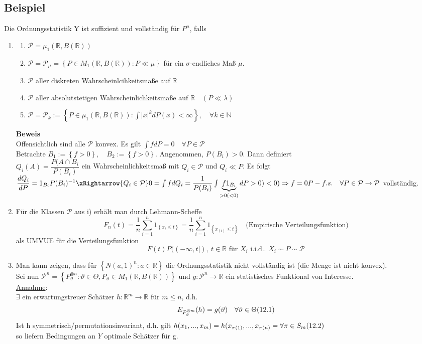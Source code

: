 \documentclass[german,10pt,oneside, fleqn, a4paper]{article}
\let\marvosymLightning\Lightning
\newcommand {\R}	{\mathbb{R}}
\newcommand {\N}	{\mathbb{N}}
\newcommand{\Ra}	{\Rightarrow}
\newcommand{\ra}{\rightarrow}
\newcommand{\sm}[2][\infty]{\sum\limits_{#2}^{#1}}
\newcommand{\brac}[1]{\left\lbrace #1\right\rbrace}
\newcommand{\mc}[1]{\mathcal{#1}}
\newcommand{\beweis}{\textbf{Beweis}\\}
\newcommand{\1}[1]{1_{#1}}
\newcommand{\2}[1]{\1{\brac{#1}}}
\newcommand{\wid}{\text{\marvosymLightning}}
\newcommand{\p}{\mc{P}}
\newcommand{\sumi}{\sm[n]{i=1}}
\newcommand{\qf}{\quad\forall}
\newcommand{\stuff}{{\otimes n}}
\begin{document}
\subsection{Beispiel}
\label{12.3}
Die Ordnungsstatistik Y ist suffizient und vollständig für $P^n$, falls
\begin{enumerate}[label=(\roman*)]
\item\begin{enumerate}[label=(\alph*)]
	\item $\p=\mu_1(\R,B(\R))$
	\item $\p=\p_\mu=\brac{P\in M_1(\R,B(\R)):P\ll\mu}$ für ein $\sigma$-endliches Maß $\mu$.
	\item $\p$ aller diskreten Wahrscheinlcihkeitsmaße auf $\R$
	\item $\p$ aller absolutstetigen Wahrscheinlichkeitsmaße auf $\R\quad (P\ll\lambda)$
	\item $\p=\p_k:=\brac{P\in\mu_1(\R,B(\R)):\int|x|^kdP(x)<\infty},\qf k\in\N$
\end{enumerate}
\beweis
Offensichtlich sind alle $\p$ konvex. Es gilt $\int fdP=0\qf P\in\p$\\
Betrachte $B_1:=\brac{f>0},\quad B_2:=\brac{f>0}$. Angenommen, $P(B_i)>0$. Dann definiert \\
$Q_i(A)=\dfrac{P(A\cap B_i}{P(B_i)}$ ein Wahrscheinlichkeitsmaß mit $Q_i\in\p$ und $Q_i\ll P$. Es folgt\\
$\dfrac{dQ_i}{dP}=1_{B_i}P(B_i)^{-1}\xRightarrow{Q_i\in\p} 0=\int fdQ_i=\dfrac{1}{P(B_i)}\int \underbrace{f1_{B_i}}_{>0(<0)}dP>0)<0)\\
\Ra f=0 P-f.s.\qf P\in\p\ra\p$ vollständig. \ \ \ \wid

\item Für die Klassen $\p$ aus i) erhält man durch Lehmann-Scheffe \[
F_n(t)=\dfrac{1}{n}\sumi 1_{\brac{x_i\leq t}}=\dfrac{1}{n}\sumi 1_{\brac{x_{(i)}\leq t}}\quad\text{(Empirische Verteilungsfunktion)}\]
als UMVUE für die Verteilungsfunktion \[F(t)P((-\infty,t]),\ t\in\R\text{ für }X_i\text{ i.i.d.. }X_i\sim P\sim\p\]

\item Man kann zeigen, dass für $\brac{N(a,1)^n:a\in\R}$ die Ordnungsstatistik nicht vollständig ist (die Menge ist nicht konvex).\\
Sei nun $\p^n=\brac{P_\vartheta^\stuff:\vartheta\in\Theta, P_\vartheta\in M_1(\R,B(\R))}$ und $g:\p^n\ra\R$ ein statistisches Funktional von Interesse.\\
\underline{Annahme}:\\
$\exists$ ein erwartungstreuer Schätzer $h:\R^m\ra\R$ für $m\leq n$, d.h.\[
E_{P_\vartheta^{\otimes m}}(h)=g(\vartheta)\qf\vartheta\in\Theta\hfill(12.1)\]
Ist h symmetrisch/permutationsinvariant, d.h. gilt $h(x_1,...,x_m)=h(x_{\pi(1)},...,x_{\pi(n)}=\forall\pi\in S_m\hfill (12.2)$\\
so liefern Bedingungen an $Y$ optimale Schätzer für g.
\end{enumerate}
\end{document}
